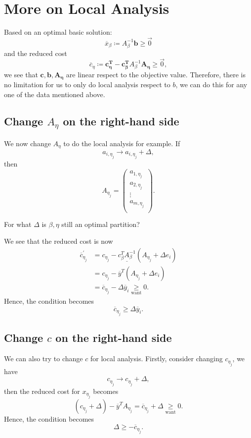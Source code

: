 \section{More on Local Analysis}
\begin{prev}
	Based on an optimal basic solution:
	\[
		\overline{x}_{\beta} \coloneqq A^{-1}_{\beta}\bm{b}\geq \vec{0}
	\]
	and the reduced cost
	\[
		\overline{c}_{\eta}\coloneqq \bm{c_{\eta}^{T}} - \bm{c^{T}_{\beta}}A^{-1}_{\beta}\bm{A_{\eta}} \geq \vec{0},
	\]
	we see that \(\bm{c, b, A_{\eta}}\) are linear respect to the objective value. Therefore, there is no limitation for us to only do local analysis
	respect to \(b\), we can do this for any one of the data mentioned above.
\end{prev}

\subsection{Change \(A_{\eta}\) on the right-hand side}
We now change \(A_{\eta}\) to do the local analysis for example. If
\[
	a_{i, \eta_j} \to a_{i, \eta_{j}}+\Delta,
\]
then
\[
	A_{\eta_j} = \begin{pmatrix}
		a_{1, \eta_{j}} \\
		a_{2, \eta_{j}} \\
		\vdots          \\
		a_{m, \eta_{j}} \\
	\end{pmatrix}.
\]
\begin{problem}
For what \(\Delta\) is \(\beta, \eta\) still an optimal partition?
\end{problem}

\begin{answer}
	We see that the reduced cost is now
	\[
		\begin{split}
			\overline{c}_{\eta_{j}}^\prime &= c_{\eta_{j}} - \underline{c_{\beta}^{T}A^{-1}_{\beta}}\left( A_{\eta_{j}} +\Delta e_{i}\right) \\
			&= c_{\eta_{j}} - \overline{y}^{T}(A_{\eta_{j}}+\Delta e_{i})\\
			&= \overline{c}_{\eta_{j}} - \Delta \overline{y}_i\underset{\text{want}}{\geq} 0.
		\end{split}
	\]
	Hence, the condition becomes
	\[
		\overline{c}_{\eta_{j}} \geq \Delta \overline{y}_i.
	\]
\end{answer}

\subsection{Change \(c\) on the right-hand side}
We can also try to change \(c\) for local analysis. Firstly, consider changing \(c_{\eta_{j}}\), we have
\[
	c_{\eta_{j}}\to c_{\eta_{j}}+\Delta,
\]
then the reduced cost for \(x_{\eta_{j}}\) becomes
\[
	(c_{\eta_{j}}+\Delta) - \overline{y}^{T}A_{\eta_{j}} = \overline{c}_{\eta_{j}}+\Delta\underset{\text{want}}{\geq} 0.
\]
Hence, the condition becomes
\[
	\Delta\geq -\overline{c}_{\eta_{j}}.
\]

